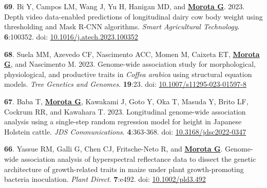\documentclass[margin,line,10pt]{res}
\newenvironment{list1}{
  \begin{list}{\ding{113}}{%
      \setlength{\itemsep}{0in}
      \setlength{\parsep}{0in} \setlength{\parskip}{0in}
      \setlength{\topsep}{0in} \setlength{\partopsep}{0in} 
      \setlength{\leftmargin}{0.17in}}}{\end{list}}
\begin{document}
\begin{resume}
\begin{list1}
\end{list1}



\section{}
\begin{list1}


  \item  [{\bf 69}.]  Bi Y, Campos LM, Wang J, Yu H, Hanigan MD, and \textbf{\underline{Morota G}}. 2023. Depth video data-enabled predictions of longitudinal dairy cow body weight using thresholding and Mask R-CNN algorithms. \emph{Smart Agricultural Technology}. \textbf{6}:100352. doi: \textcolor{blue}{\href{https://doi.org/10.1016/j.atech.2023.100352}{10.1016/j.atech.2023.100352}}

  \vspace{0.5cm}

  \item  [{\bf 68}.] Suela MM, Azevedo CF, Nascimento ACC, Momen M, Caixeta ET, \textbf{\underline{Morota G}}, and Nascimento M. 2023. Genome-wide association study for morphological, physiological, and productive traits in \textit{Coffea arabica} using structural equation models. \emph{Tree Genetics and Genomes}. \textbf{19}:23. doi: \textcolor{blue}{\href{https://doi.org/10.1007/s11295-023-01597-8}{10.1007/s11295-023-01597-8}} 

      \vspace{0.5cm}

  \item  [{\bf 67}.] Baba T, \textbf{\underline{Morota G}}, Kawakami J, Goto Y, Oka T, Masuda Y, Brito LF, Cockrum RR, and Kawahara T. 2023. Longitudinal genome-wide association analysis using a single-step random regression model for height in Japanese Holstein cattle.  \emph{JDS Communications}. \textbf{4}:363-368. doi: \textcolor{blue}{\href{https://doi.org/10.3168/jdsc2022-0347}{10.3168/jdsc2022-0347}} 


  \vspace{0.5cm}

  \item [{\bf 66}.] Yassue RM, Galli G, Chen CJ, Fritsche-Neto R, and \textbf{\underline{Morota G}}.  Genome-wide association analysis of hyperspectral reflectance data to dissect the genetic architecture of growth-related traits in maize under plant growth-promoting bacteria inoculation. \emph{Plant Direct}. \textbf{7}:e492. doi: \textcolor{blue}{\href{https://doi.org/10.1002/pld3.492}{10.1002/pld3.492}}  


\end{list1}
\end{resume}
\end{document}
